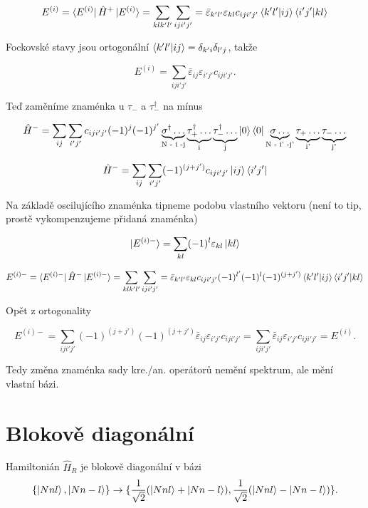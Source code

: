 \documentclass{article}
\begin{document}
    $$E^{(i)} = \bra{E^{(i)}} \hat{H}^+ \ket{E^{(i)}} = \sum_{klk'l'}\sum_{iji'j'} = 
    \bar{\varepsilon}_{k'l'}\varepsilon_{kl} c_{iji'j'} \braket{k'l'|ij}\braket{i'j'|kl}$$

    Fockovské stavy jsou ortogonální $\braket{k'l'|ij} = \delta_{k'i}\delta_{l'j}$, takže 

    $$E^{(i)} =\sum_{iji'j'}
    \bar{\varepsilon}_{ij}\varepsilon_{i'j'} c_{iji'j'}.$$

    Teď zaměníme znaménka u $\tau_-$ a $\tau_-^{\dagger}$ na mínus

    $$\hat{H}^- = 
     \sum_{i j} \sum_{i' j'} c_{iji'j'} (-1)^{j}(-1)^{j'} \underbrace{\sigma^{\dagger} \dots}_\text{N - i -j}
    \underbrace{\tau^{\dagger}_+ \dots}_\text{i}
    \underbrace{\tau^{\dagger}_- \dots}_\text{j} 
    \ket{0}\bra{0} \underbrace{\sigma\dots}_\text{N - i' -j'}
    \underbrace{\tau_+ \dots}_\text{i'}
    \underbrace{\tau_- \dots}_\text{j'}$$

    $$\hat{H}^- = 
    \sum_{i j} \sum_{i' j'}  (-1)^{(j + j')} c_{iji'j'} \ket{ij}\bra{i'j'}$$

    Na základě oscilujícího znaménka tipneme podobu vlastního vektoru (není to tip, prostě vykompenzujeme přidaná znaménka)
    
    $$\ket{E^{(i)-}} = \sum_{kl} (-1)^l \varepsilon_{kl} \ket{kl}$$

    $$E^{(i)-} = \bra{E^{(i)-}} \hat{H}^- \ket{E^{(i)-}} = \sum_{klk'l'}\sum_{iji'j'} = 
    \bar{\varepsilon}_{k'l'}\varepsilon_{kl} c_{iji'j'} (-1)^{l'} (-1)^l (-1)^{(j + j')} \braket{k'l'|ij}\braket{i'j'|kl}$$
    
    Opět z ortogonality 

    $$E^{(i)-} = \sum_{iji'j'} (-1)^{(j + j')}(-1)^{(j + j')}
    \bar{\varepsilon}_{ij}\varepsilon_{i'j'} c_{iji'j'} = \sum_{iji'j'}
    \bar{\varepsilon}_{ij}\varepsilon_{i'j'} c_{iji'j'} = E^{(i)}. $$

    Tedy změna znaménka sady kre./an. operátorů nemění spektrum, ale mění vlastní bázi.

    \section{Blokově diagonální}


    Hamiltonián $\hat{H}_R$ je blokově diagonální v bázi 
    $$\{\ket{Nnl},\ket{Nn-l}\} \rightarrow \{\frac{1}{\sqrt{2}}(\ket{Nnl} + \ket{Nn-l}),\frac{1}{\sqrt{2}}(\ket{Nnl} - \ket{Nn-l})\}.$$
    
\end{document}
